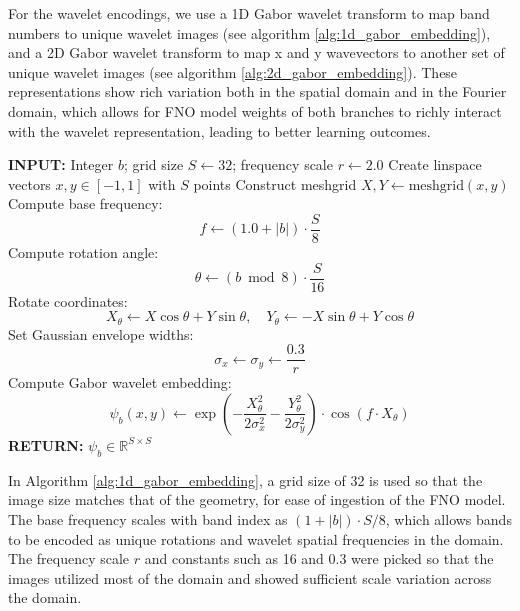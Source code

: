\documentclass[preprint,review,12pt]{elsarticle}
\begin{document}
For the wavelet encodings, we use a 1D Gabor wavelet transform to map band numbers to unique wavelet images (see algorithm \ref{alg:1d_gabor_embedding}), and a 2D Gabor wavelet transform to map x and y wavevectors to another set of unique wavelet images (see algorithm \ref{alg:2d_gabor_embedding}). These representations show rich variation both in the spatial domain and in the Fourier domain, which allows for FNO model weights of both branches to richly interact with the wavelet representation, leading to better learning outcomes. 

\begin{algorithm}[H]
\caption{1D Gabor Wavelet Embedding from Scalar Input}
\label{alg:1d_gabor_embedding}
\begin{algorithmic}[1]
\STATE \textbf{INPUT:} Integer \( b \); grid size \( S \leftarrow 32 \); frequency scale \( r \leftarrow 2.0 \)
\STATE Create linspace vectors \( x, y \in [-1, 1] \) with \( S \) points
\STATE Construct meshgrid \( X, Y \leftarrow \text{meshgrid}(x, y) \)
\STATE Compute base frequency:
\[
f \leftarrow (1.0 + |b|) \cdot \frac{S}{8}
\]
\STATE Compute rotation angle:
\[
\theta \leftarrow (b \bmod 8) \cdot \frac{S}{16}
\]
\STATE Rotate coordinates:
\[
X_\theta \leftarrow X \cos \theta + Y \sin \theta, \quad
Y_\theta \leftarrow -X \sin \theta + Y \cos \theta
\]
\STATE Set Gaussian envelope widths:
\[
\sigma_x \leftarrow \sigma_y \leftarrow \frac{0.3}{r}
\]
\STATE Compute Gabor wavelet embedding:
\[
\psi_b(x, y) \leftarrow
\exp\left(-\frac{X_\theta^2}{2 \sigma_x^2} - \frac{Y_\theta^2}{2 \sigma_y^2}\right)
\cdot \cos(f \cdot X_\theta)
\]
\STATE \textbf{RETURN:} \( \psi_b \in \mathbb{R}^{S \times S} \)
\end{algorithmic}
\end{algorithm}

In Algorithm \ref{alg:1d_gabor_embedding}, a grid size of 32 is used so that the image size matches that of the geometry, for ease of ingestion of the FNO model. The base frequency scales with band index as \((1+|b|)\cdot S/8\), which allows bands to be encoded as unique rotations and wavelet spatial frequencies in the domain. The frequency scale $r$ and constants such as 16 and 0.3 were picked so that the images utilized most of the domain and showed sufficient scale variation across the domain.
\end{document}
